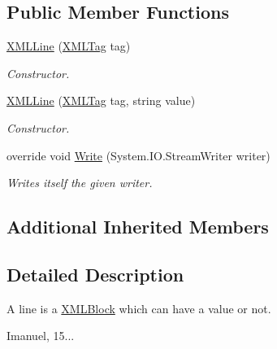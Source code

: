\subsection*{Public Member Functions}
\begin{DoxyCompactItemize}
\item 
\hyperlink{class_a_rdev_kit_1_1_model_1_1_project_1_1_file_1_1_x_m_l_line_a3d11a65937837fa4fb9c7163d4088fe5}{X\-M\-L\-Line} (\hyperlink{class_a_rdev_kit_1_1_model_1_1_project_1_1_file_1_1_x_m_l_tag}{X\-M\-L\-Tag} tag)
\begin{DoxyCompactList}\small\item\em Constructor. \end{DoxyCompactList}\item 
\hyperlink{class_a_rdev_kit_1_1_model_1_1_project_1_1_file_1_1_x_m_l_line_a915310c8f5bbec9bc9f15e8975e8ae89}{X\-M\-L\-Line} (\hyperlink{class_a_rdev_kit_1_1_model_1_1_project_1_1_file_1_1_x_m_l_tag}{X\-M\-L\-Tag} tag, string value)
\begin{DoxyCompactList}\small\item\em Constructor. \end{DoxyCompactList}\item 
override void \hyperlink{class_a_rdev_kit_1_1_model_1_1_project_1_1_file_1_1_x_m_l_line_a7f58add9edb498bee39f2c09dc98c323}{Write} (System.\-I\-O.\-Stream\-Writer writer)
\begin{DoxyCompactList}\small\item\em Writes itself the given writer. \end{DoxyCompactList}\end{DoxyCompactItemize}
\subsection*{Additional Inherited Members}


\subsection{Detailed Description}
A line is a \hyperlink{class_a_rdev_kit_1_1_model_1_1_project_1_1_file_1_1_x_m_l_block}{X\-M\-L\-Block} which can have a value or not. 

Imanuel, 15... 

